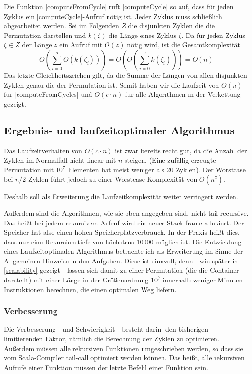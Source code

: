 Die Funktion |computeFromCycle| ruft |computeCycle| so auf, dass für jeden Zyklus ein |computeCycle|-Aufruf nötig ist. Jeder Zyklus muss schließlich abgearbeitet werden.
Sei im Folgenden $Z$ die disjunkten Zyklen die die Permutation darstellen und $k(\zeta)$ die Länge eines Zyklus $\zeta$.
Da für jeden Zyklus $\zeta \in Z$ der Länge $z$ ein Aufruf mit $O(z)$ nötig wird, ist die Gesamtkomplexität
\[O(\sum_{i=0}^{o}{O(k(\zeta_i))})=O(O(\sum_{i=0}^{o}{k(\zeta_i)}))=O(n)\]
Das letzte Gleichheitszeichen gilt, da die Summe der Längen von allen disjunkten Zyklen genau die der Permutation ist.
Somit haben wir die Laufzeit von $O(n)$ für |computeFromCycles| und $O(c \cdot n)$ für alle Algorithmen in der Verkettung gezeigt.
\clearpage
\subsection{Ergebnis- und laufzeitoptimaler Algorithmus} %
Das Laufzeitverhalten von $O(c \cdot n)$ ist zwar bereits recht gut, da die Anzahl der Zyklen im Normalfall nicht linear mit $n$ steigen.
(Eine zufällig erzeugte Permutation mit $10^7$ Elementen hat meist weniger als 20 Zyklen).
Der Worstcase bei $n/2$ Zyklen führt jedoch zu einer Worstcase-Komplexität von $O(n^2)$.

Deshalb soll als Erweiterung die Laufzeitkomplexität weiter verringert werden.

Außerdem sind die Algorithmen, wie sie oben angegeben sind, nicht tail-recursive.
Das heißt bei jedem rekursivem Aufruf wird ein neuer Stack-frame allokiert.
Der Speicher hat also einen hohen Speicherplatzverbrauch.
In der Praxis heißt dies, dass nur eine Rekursionstiefe von höchstens 10000 möglich ist.
Die Entwicklung eines Laufzeitoptimalen Algorithmus betrachte ich als Erweiterung im Sinne der Allgemeinen Hinweise in den Aufgaben.
Diese ist sinnvoll, denn - wie später in \ref{scalability} gezeigt -
lassen sich damit zu einer Permutation (die die Container darstellt)
mit einer Länge in der Größenordnung $10^7$ innerhalb weniger Minuten Instruktionen berechnen, die einen optimalen Weg liefern.
\subsubsection{Verbesserung}
\label{fast_cycler}
Die Verbesserung - und Schwierigkeit - besteht darin, den bisherigen limitierenden Faktor, nämlich die Berechnung der Zyklen zu optimieren.
Außerdem müssen alle rekursiven Funktionen umgeschrieben werden, so dass sie vom Scala-Compiler tail-call optimiert werden können.
Das heißt, alle rekursiven Aufrufe einer Funktion müssen der letzte Befehl einer Funktion sein.

